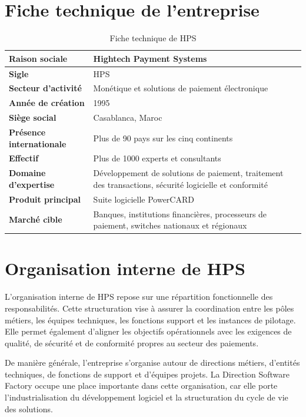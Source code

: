 \section{Fiche technique de l'entreprise}

\begin{table}[h!]
    \centering
    \caption{Fiche technique de HPS}
    \label{tab:fiche-technique-hps}
    \begin{tabularx}{\textwidth}{>{\bfseries}p{4.2cm}X}
        \toprule
        Raison sociale & Hightech Payment Systems \\
        \midrule
        Sigle & HPS \\
        Secteur d'activité & Monétique et solutions de paiement électronique \\
        Année de création & 1995 \\
        Siège social & Casablanca, Maroc \\
        Présence internationale & Plus de 90 pays sur les cinq continents \\
        Effectif & Plus de 1000 experts et consultants \\
        Domaine d'expertise & Développement de solutions de paiement, traitement des transactions, sécurité logicielle et conformité \\
        Produit principal & Suite logicielle PowerCARD \\
        Marché cible & Banques, institutions financières, processeurs de paiement, switches nationaux et régionaux \\
        \bottomrule
    \end{tabularx}
\end{table}

\section{Organisation interne de HPS}

L'organisation interne de HPS repose sur une répartition fonctionnelle des responsabilités. Cette structuration vise à assurer la coordination entre les pôles métiers, les équipes techniques, les fonctions support et les instances de pilotage. Elle permet également d'aligner les objectifs opérationnels avec les exigences de qualité, de sécurité et de conformité propres au secteur des paiements.

De manière générale, l'entreprise s'organise autour de directions métiers, d'entités techniques, de fonctions de support et d'équipes projets. La Direction Software Factory occupe une place importante dans cette organisation, car elle porte l'industrialisation du développement logiciel et la structuration du cycle de vie des solutions.

